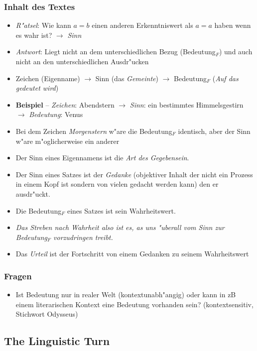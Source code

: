 \documentclass[]{scrartcl}
\begin{document}
\subsubsection{Inhalt des Textes}
\begin{itemize}
  \item \emph{R"atsel}: Wie kann $a = b$ einen anderen Erkenntniswert als $ a = a$ haben wenn es wahr ist? $\rightarrow$ \emph{Sinn} 
  \item \emph{Antwort}: Liegt nicht an dem unterschiedlichen Bezug (Bedeutung$_{F}$) und auch nicht an den unterschiedlichen Ausdr"ucken
  \item Zeichen (Eigenname) $\rightarrow$ Sinn (das \emph{Gemeinte}) $\rightarrow$ Bedeutung$_{F}$ (\emph{Auf das gedeutet wird})
  \item \textbf{Beispiel} -- \emph{Zeichen}: Abendstern $\rightarrow$ \emph{Sinn}: ein bestimmtes Himmelsgestirn $\rightarrow$ \emph{Bedeutung}: Venus 
  \item Bei dem Zeichen \emph{Morgenstern} w"are die Bedeutung$_{F}$ identisch, aber der Sinn w"are m"oglicherweise ein anderer
  \item Der Sinn eines Eigennamens ist die \emph{Art des Gegebensein}.
  \item Der Sinn eines Satzes ist der \emph{Gedanke} (objektiver Inhalt der nicht ein Prozess in einem Kopf ist sondern von vielen gedacht werden kann) den er ausdr"uckt.
  \item Die Bedeutung$_{F}$ eines Satzes ist sein Wahrheitswert.
  \item \emph{Das Streben nach Wahrheit also ist es, as uns "uberall vom Sinn zur Bedeutung$_{F}$ vorzudringen treibt.}
  \item Das \emph{Urteil} ist der Fortschritt von einem Gedanken zu seinem Wahrheitswert
\end{itemize}
\subsubsection{Fragen}
\begin{itemize}
  \item Ist Bedeutung nur in realer Welt (kontextunabh"angig) oder kann in zB einem literarischen Kontext eine Bedeutung vorhanden sein? (kontextsensitiv, Stichwort Odysseus)
\end{itemize}

\subsection{The Linguistic Turn}
\end{document}
